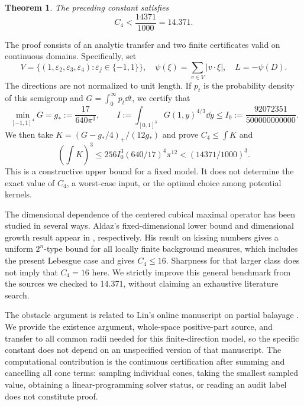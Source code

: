 \documentclass[11pt,a4paper]{article}
\newtheorem{theorem}{Theorem}[section]
\theoremstyle{remark}\newtheorem{remark}[theorem]{Remark}
\newcommand{\1}{\mathbf1}\newcommand{\pos}[1]{(#1)_+}
\begin{document}
\begin{theorem}\label{thm:main}
The preceding constant satisfies
\[ C_4<\frac{14371}{1000}=14.371. \]
\end{theorem}
The proof consists of an analytic transfer and two finite certificates valid on continuous domains. Specifically, set
\[
 V=\{(1,\varepsilon_2,\varepsilon_3,\varepsilon_4):\varepsilon_j\in\{-1,1\}\},
 \quad\psi(\xi)=\sum_{v\in V}|v\cdot\xi|,\quad L=-\psi(D).
\]
The directions are not normalized to unit length. If $p_t$ is the probability density of this semigroup and $G=\int_0^\infty p_t\dd t$, we certify that
\begin{equation}\label{eq:inputs}
 \min_{[-1,1]^4}G=g_*:=\frac{17}{640\pi^3},\qquad
 I:=\int_{[0,1]^3}G(1,y)^{4/3}\dd y\le I_0:=\frac{92072351}{500000000000}.
\end{equation}
We then take $K=(G-g_*/4)_+/(12g_*)$ and prove $C_4\le\int K$ and
\begin{equation}\label{eq:costsummary}
 (\int K)^3\le256 I_0^3(640/17)^4\pi^{12}<(14371/1000)^3.
\end{equation}
This is a constructive upper bound for a fixed model. It does not determine the exact value of $C_4$, a worst-case input, or the optimal choice among potential kernels.

The dimensional dependence of the centered cubical maximal operator has been studied in several ways. Aldaz's fixed-dimensional lower bound and dimensional growth result appear in \cite{Aldaz2000,Aldaz2011}, respectively. His result on kissing numbers \cite{AldazKissing2020} gives a uniform $2^n$-type bound for all locally finite background measures, which includes the present Lebesgue case and gives $C_4\le16$. Sharpness for that larger class does not imply that $C_4=16$ here. We strictly improve this general benchmark from the sources we checked to 14.371, without claiming an exhaustive literature search.

The obstacle argument is related to Lin's online manuscript on partial balayage \cite{LinPartialBalayage}. We provide the existence argument, whole-space positive-part source, and transfer to all common radii needed for this finite-direction model, so the specific constant does not depend on an unspecified version of that manuscript. The computational contribution is the continuous certification after summing and cancelling all cone terms: sampling individual cones, taking the smallest sampled value, obtaining a linear-programming solver status, or reading an audit label does not constitute proof.
\end{document}
